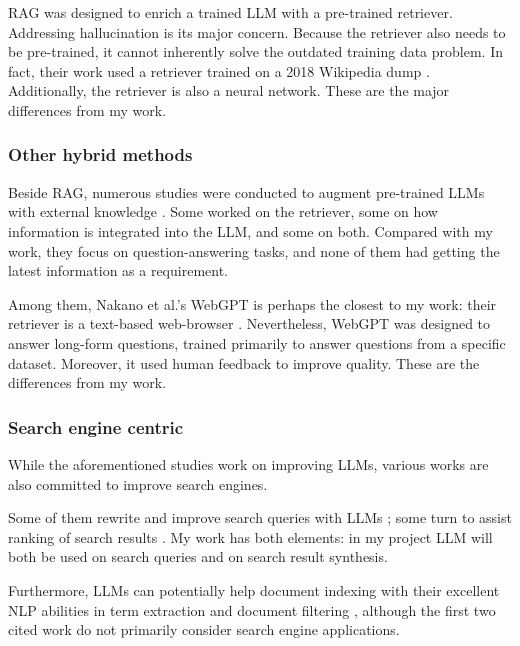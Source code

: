 \documentclass[final-report]{report-template}
\begin{document}
RAG was designed to enrich a trained LLM with a pre-trained retriever.
Addressing hallucination is its major concern. Because the retriever also
needs to be pre-trained, it cannot inherently solve the outdated training data
problem. In fact, their work used a retriever trained on a 2018 Wikipedia dump
\cite[Section 3]{rag}. Additionally, the retriever is also a neural network.
These are the major differences from my work.

\subsubsection{Other hybrid methods}
Beside RAG, numerous studies were conducted to augment pre-trained LLMs with
external knowledge \cite{hybrid.method.1, hybrid.method.2, hybrid.method.3,
hybrid.method.4, webgpt}.
Some worked on the retriever, some on how information is integrated into the
LLM, and some on both. Compared with my work, they focus on question-answering
tasks, and none of them had getting the latest information as a requirement.

Among them, Nakano et al.'s WebGPT is perhaps the closest to my work: their
retriever is a text-based web-browser \cite{webgpt}. Nevertheless, WebGPT was
designed to answer long-form questions, trained primarily to answer questions
from a specific dataset. Moreover, it used human feedback to improve quality.
These are the differences from my work.

\subsubsection{Search engine centric}
While the aforementioned studies work on improving LLMs, various works are also
committed to improve search engines. 

Some of them rewrite and improve search queries with LLMs
\cite{query.rewriting.1, query.rewriting.2}; some turn to assist ranking of
search results \cite{search.result.rerank.1, search.result.rerank.1}. My work
has both elements: in my project LLM will both be used on search queries and
on search result synthesis.

Furthermore, LLMs can potentially help document indexing with their excellent
NLP abilities in term extraction \cite{llm.term.extraction.1,
llm.term.extraction.2} and document filtering \cite{llm.indexing.filter},
although the first two cited work do not primarily consider search engine
applications. 
\end{document}

